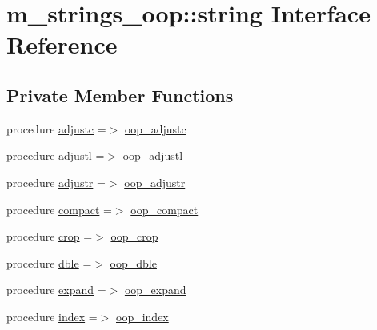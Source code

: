 \hypertarget{structm__strings__oop_1_1string}{}\section{m\+\_\+strings\+\_\+oop\+:\+:string Interface Reference}
\label{structm__strings__oop_1_1string}
\subsection*{Private Member Functions}
\begin{DoxyCompactItemize}
\item 
procedure \mbox{\hyperlink{structm__strings__oop_1_1string_a00b51e0438ecd366e3a42e28e7b2996b}{adjustc}} =$>$ \mbox{\hyperlink{namespacem__strings__oop_a9fa932c23648e737230553a8e7bfb15b}{oop\+\_\+adjustc}}
\item 
procedure \mbox{\hyperlink{structm__strings__oop_1_1string_a1f88b4f2a38506e18657f3f1a62e98f9}{adjustl}} =$>$ \mbox{\hyperlink{namespacem__strings__oop_a8e2457b4a1c4489e9600e340fa9ce533}{oop\+\_\+adjustl}}
\item 
procedure \mbox{\hyperlink{structm__strings__oop_1_1string_a07c71514613acbde4215d06e493b807b}{adjustr}} =$>$ \mbox{\hyperlink{namespacem__strings__oop_abb0dfa5646259e4fc768700eada111ac}{oop\+\_\+adjustr}}
\item 
procedure \mbox{\hyperlink{structm__strings__oop_1_1string_a1b65e2e71aeaa708ae264e0b49c26734}{compact}} =$>$ \mbox{\hyperlink{namespacem__strings__oop_ac02aecbaebcf57833b544de4f50c89a6}{oop\+\_\+compact}}
\item 
procedure \mbox{\hyperlink{structm__strings__oop_1_1string_a56c652bda0c81f09810f81fceb220d14}{crop}} =$>$ \mbox{\hyperlink{namespacem__strings__oop_aa1a395d359592720a842054fd0aaff0a}{oop\+\_\+crop}}
\item 
procedure \mbox{\hyperlink{structm__strings__oop_1_1string_af56cb5026861cde949c6c08a3781f18e}{dble}} =$>$ \mbox{\hyperlink{namespacem__strings__oop_aa6eaf2b8a12a905d0ebaa21a84871dec}{oop\+\_\+dble}}
\item 
procedure \mbox{\hyperlink{structm__strings__oop_1_1string_a2c773ed4625515239ebe1867d749a155}{expand}} =$>$ \mbox{\hyperlink{namespacem__strings__oop_a5b96d2a6f242a096cd5788cf0802e825}{oop\+\_\+expand}}
\item 
procedure \mbox{\hyperlink{structm__strings__oop_1_1string_aa4f1aaf5ef49e9332b96c7e0b0c47ab3}{index}} =$>$ \mbox{\hyperlink{namespacem__strings__oop_aafe02b26ccba21eb8a35e9fa99d6c790}{oop\+\_\+index}}

\end{DoxyCompactItemize}

